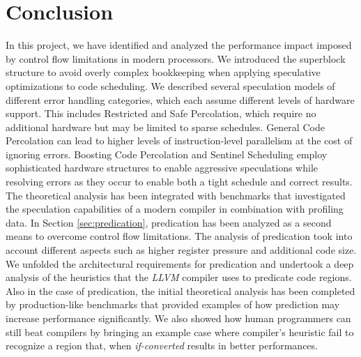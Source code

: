 \section{Conclusion}
In this project, we have identified and analyzed the performance impact imposed by control flow limitations in modern processors. We introduced the superblock structure to avoid overly complex bookkeeping when applying speculative optimizations to code scheduling. We described several speculation models of different error handling categories, which each assume different levels of hardware support. This includes Restricted and Safe Percolation, which require no additional hardware but may be limited to sparse schedules. General Code Percolation can lead to higher levels of instruction-level parallelism at the cost of ignoring errors. Boosting Code Percolation and Sentinel Scheduling employ sophisticated hardware structures to enable aggressive speculations while resolving errors as they occur to enable both a tight schedule and correct results. \newline
The theoretical analysis has been integrated with benchmarks that investigated the speculation capabilities of a modern compiler in combination with profiling data. \newline 
In Section \ref{sec:predication}, predication has been analyzed as a second means to overcome control flow limitations. The analysis of predication took into account different aspects such as higher register pressure and additional code size. We unfolded the architectural requirements for predication and undertook a deep analysis of the heuristics that the \textit{LLVM} compiler uses to predicate code regions. 
Also in the case of predication, the initial theoretical analysis has been completed by production-like benchmarks that provided examples of how prediction may increase performance significantly. We also showed how human programmers can still beat compilers by bringing an example case where compiler's heuristic fail to recognize a region that, when \textit{if-converted} results in better performances.